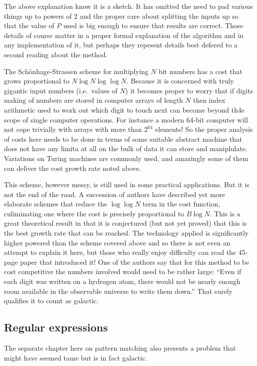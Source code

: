 The above explanation know it is a sketch. It has omitted the need to
pad various things up to powers of 2 and the proper care about splitting the
inputs up so that the value of $P$ used is big enough to ensure that
results are correct. Those details of course matter in a proper formal
explanation of the algorithm and in any implementation of it, but perhaps
they repesent details best defered to a second reading about the method.

The Sch\"{o}nhage-Strassen scheme for multiplying $N$ bit numbers has a
cost that grows proportional to $N \log N \log \log N$. Because it is
concerned with truly gigantic input numbers (i.e.\ values of $N$) it
becomes proper to worry that if digits making of numbers are stored
in computer arrays of length $N$ then index arithmetic used to work out
which digit to touch next can become beyond th4e scope of single
computer operations. For instance a modern 64-bit computer will not
cope trivially with arrays with more than $2^{64}$ elements! So the proper
analysis of costs here needs to be done in terms of some suitable abstract
machine that does not have any limita at all on the bulk of data it
can store and maniplulate. Variations on Turing machines are commonly
used, and amazingly some of them can deliver the cost growth rate
noted above.

This scheme, however messy, is still used in some practical applications.
But it is not the end of the road. A succession of authors have described
yet more elaborate schemes that reduce the $\log \log N$ term in the
cost function, culiminating one\cite{HarveyvanderHoeven} where the cost
is precisely proportional to $B \log N$. This is a great theoretical result
in that it is conjectured (but not yet proved) that this is the best
growth rate that can be reached. The technology applied is significantly
higher powered than the scheme covered above and so there is not even an
attempt to explain it here, but those who really enjoy difficulty can
read the 45-page paper that introduced it! One of the authors
say that for this method to be cost competitive the numbers involved
would need to be rather large: ``Even if each digit was written on a
hydrogen atom, there would not be nearly enough room available in the
observable universe to write them down.'' That surely qualifies it
to count as galactic. 

\subsection{Regular expressions}
The separate chapter here on pattern matching also presents a problem
that might have seemed tame but is in fact galactic.

